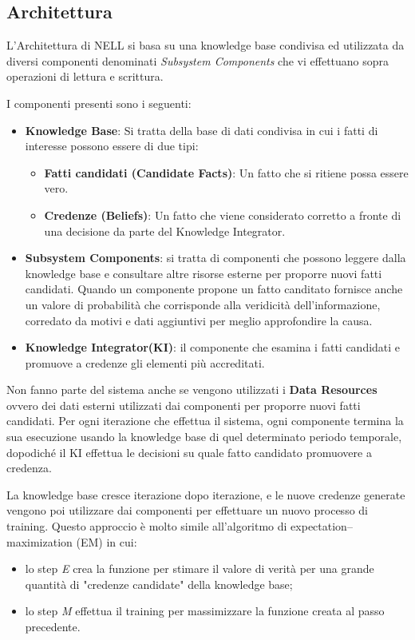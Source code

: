 \subsection{Architettura}
L'Architettura di NELL si basa su una knowledge base condivisa ed utilizzata da diversi componenti denominati \textit{Subsystem Components} che vi effettuano sopra operazioni di lettura e scrittura. 

I componenti presenti sono i seguenti:
\begin{itemize}
    \item \textbf{Knowledge Base}: Si tratta della base di dati condivisa in cui i fatti di interesse possono essere di due tipi:
    \begin{itemize}
        \item \textbf{Fatti candidati (Candidate Facts)}: Un fatto che si ritiene possa essere vero.
        \item \textbf{Credenze (Beliefs)}: Un fatto che viene considerato corretto a fronte di una decisione da parte del Knowledge Integrator.
    \end{itemize}
    \item \textbf{Subsystem Components}: si tratta di componenti che possono leggere dalla knowledge base e consultare altre risorse esterne per proporre nuovi fatti candidati.
    Quando un componente propone un fatto canditato fornisce anche un valore di probabilità che corrisponde alla veridicità dell'informazione, corredato da motivi e dati aggiuntivi per meglio approfondire la causa.
    \item \textbf{Knowledge Integrator(KI)}: il componente che esamina i fatti candidati e promuove a credenze gli elementi più accreditati.
\end{itemize}

\noindent Non fanno parte del sistema anche se vengono utilizzati i \textbf{Data Resources} ovvero dei dati esterni utilizzati dai componenti per proporre nuovi fatti candidati. Per ogni iterazione che effettua il sistema, ogni componente termina la sua esecuzione usando la knowledge base di quel determinato periodo temporale, dopodiché il KI effettua le decisioni su quale fatto candidato promuovere a credenza.


\noindent La knowledge base cresce iterazione dopo iterazione, e le nuove credenze generate vengono poi utilizzare dai componenti per effettuare un nuovo processo di training. Questo approccio è molto simile all'algoritmo di expectation–maximization (EM) in cui:
\begin{itemize}
    \item lo step \textit{E} crea la funzione per stimare il valore di verità per una grande quantità di "credenze candidate" della knowledge base;
    \item lo step \textit{M} effettua il training per massimizzare la funzione creata al passo precedente\cite{TowardAnArchitecture:online}.
\end{itemize}

